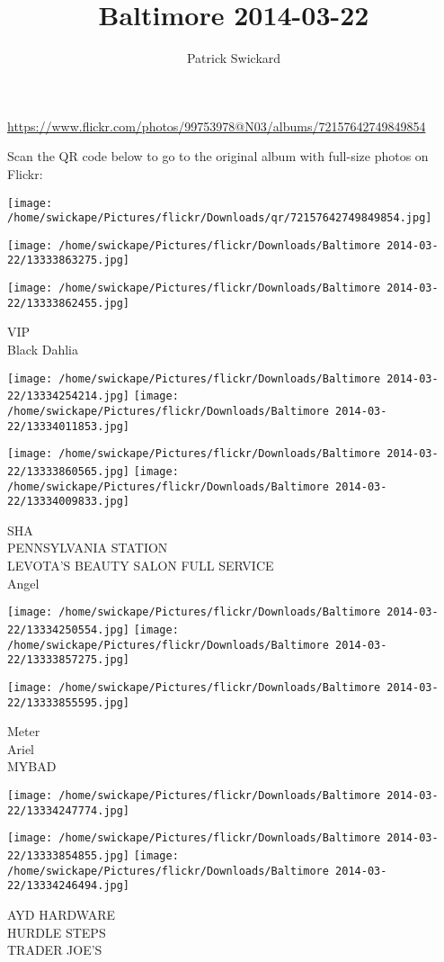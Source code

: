 \documentclass[10pt,letterpaper]{article}
\title{Baltimore 2014-03-22}
\author{Patrick Swickard}
\date{}
\begin{document}
\maketitle

\url{https://www.flickr.com/photos/99753978@N03/albums/72157642749849854}

Scan the QR code below to go to the original album with full-size photos on Flickr:

\texttt{[image: /home/swickape/Pictures/flickr/Downloads/qr/72157642749849854.jpg]}
\pagebreak

\texttt{[image: /home/swickape/Pictures/flickr/Downloads/Baltimore 2014-03-22/13333863275.jpg]}

\vspace{0.25in}
\texttt{[image: /home/swickape/Pictures/flickr/Downloads/Baltimore 2014-03-22/13333862455.jpg]}

VIP\\
Black Dahlia
\pagebreak

\texttt{[image: /home/swickape/Pictures/flickr/Downloads/Baltimore 2014-03-22/13334254214.jpg]}
\texttt{[image: /home/swickape/Pictures/flickr/Downloads/Baltimore 2014-03-22/13334011853.jpg]}

\texttt{[image: /home/swickape/Pictures/flickr/Downloads/Baltimore 2014-03-22/13333860565.jpg]}
\texttt{[image: /home/swickape/Pictures/flickr/Downloads/Baltimore 2014-03-22/13334009833.jpg]}

SHA\\
PENNSYLVANIA STATION\\
LEVOTA'S BEAUTY SALON FULL SERVICE\\
Angel
\pagebreak

\texttt{[image: /home/swickape/Pictures/flickr/Downloads/Baltimore 2014-03-22/13334250554.jpg]}
\texttt{[image: /home/swickape/Pictures/flickr/Downloads/Baltimore 2014-03-22/13333857275.jpg]}

\texttt{[image: /home/swickape/Pictures/flickr/Downloads/Baltimore 2014-03-22/13333855595.jpg]}

Meter\\
Ariel\\
MYBAD
\pagebreak

\texttt{[image: /home/swickape/Pictures/flickr/Downloads/Baltimore 2014-03-22/13334247774.jpg]}

\vspace{0.25in}
\texttt{[image: /home/swickape/Pictures/flickr/Downloads/Baltimore 2014-03-22/13333854855.jpg]}
\texttt{[image: /home/swickape/Pictures/flickr/Downloads/Baltimore 2014-03-22/13334246494.jpg]}

AYD HARDWARE\\
HURDLE STEPS\\
TRADER JOE'S
\pagebreak
\end{document}
